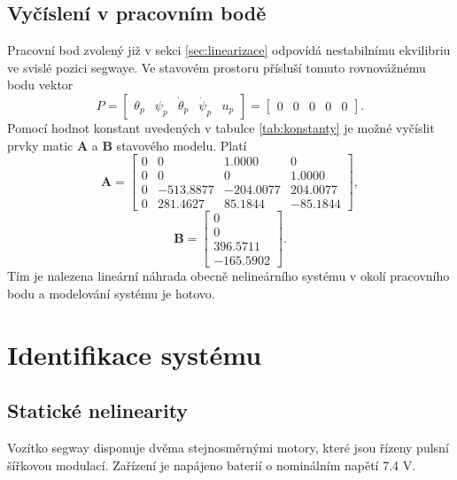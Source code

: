 \documentclass[conference]{IEEEtran}
\begin{document}
\subsection{Vyčíslení v pracovním bodě}

Pracovní bod zvolený již v sekci \ref{sec:linearizace} odpovídá nestabilnímu ekvilibriu ve svislé pozici segwaye.
Ve stavovém prostoru přísluší tomuto rovnovážnému bodu vektor 
\begin{equation}
    P = \begin{bmatrix}
        \theta_p &    \psi_p &     \dot{\theta}_p &     \dot{\psi}_p & u_p
    \end{bmatrix} = \begin{bmatrix}
        0 & 0 & 0 & 0 & 0
    \end{bmatrix}.
\end{equation}
Pomocí hodnot konstant uvedených v tabulce \ref{tab:konstanty} je možné vyčíslit prvky matic $\mathbf{A}$ a $\mathbf{B}$ stavového modelu. Platí
\begin{equation}
        \mathbf{A} = \begin{bmatrix}
            0 &        0 &    1.0000 &        0 \\
            0 &        0 &         0 &   1.0000 \\
            0 &-513.8877 & -204.0077 & 204.0077 \\
            0 & 281.4627 &   85.1844 & -85.1844
        \end{bmatrix},
    \end{equation}
    \begin{equation}
        \mathbf{B} = \begin{bmatrix}
            0 \\ 0 \\   396.5711 \\-165.5902
        \end{bmatrix}.
    \end{equation}
Tím je nalezena lineární náhrada obecně nelineárního systému v okolí pracovního bodu a modelování systému je hotovo.

\section{Identifikace systému}

\subsection{Statické nelinearity}
Vozítko segway disponuje dvěma stejnosměrnými motory, které jsou řízeny pulsní šířkovou
modulací. Zařízení je napájeno baterií o nominálním napětí 7.4 \si{V}.
\end{document}
